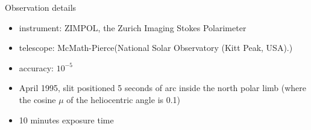 \documentclass{beamer}
\begin{document}
%
%
%
%
\begin{frame}{Observation details}
\begin{itemize}

\item instrument: ZIMPOL, the Zurich Imaging Stokes Polarimeter 
\item telescope: McMath-Pierce(National Solar Observatory (Kitt Peak, USA).)
\item accuracy: $10^{-5}$
\item April 1995, slit positioned 5 seconds of arc inside the north polar limb 
(where the cosine $\mu$ of the heliocentric angle is 0.1)
\item 10 minutes exposure time
\end{itemize}
\end{frame}
\end{document}
